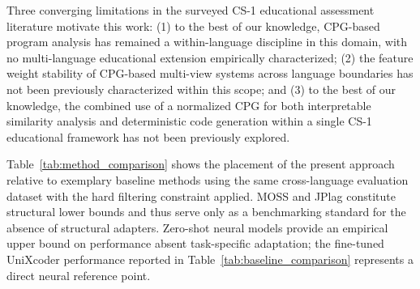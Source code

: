 Three converging limitations in the surveyed CS-1 educational assessment literature motivate this work: (1) to the best of our knowledge, CPG-based program analysis has remained a within-language discipline in this domain, with no multi-language educational extension empirically characterized; (2) the feature weight stability of CPG-based multi-view systems across language boundaries has not been previously characterized within this scope; and (3) to the best of our knowledge, the combined use of a normalized CPG for both interpretable similarity analysis and deterministic code generation within a single CS-1 educational framework has not been previously explored.

Table~\ref{tab:method_comparison} shows the placement of the present approach relative to exemplary baseline methods using the same cross-language evaluation dataset with the hard filtering constraint applied. MOSS and JPlag constitute structural lower bounds and thus serve only as a benchmarking standard for the absence of structural adapters. Zero-shot neural models provide an empirical upper bound on performance absent task-specific adaptation; the fine-tuned UniXcoder performance reported in Table~\ref{tab:baseline_comparison} represents a direct neural reference point.

